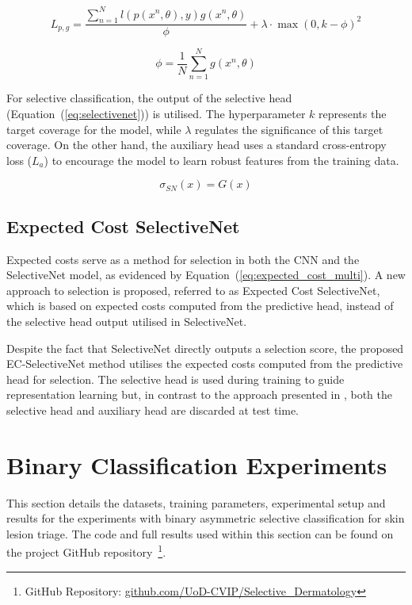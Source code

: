 \begin{equation}
	L_{p,g}=\frac{\sum^N_{n=1}l(p(x^n,\theta),y)g(x^n,\theta)}{\phi}+\lambda\cdot\max(0,k-\phi)^2
	\label{eq:selectivenet_loss}
\end{equation}

\begin{equation}
	\phi = \frac{1}{N}\sum^N_{n=1}g(x^n,\theta)
	\label{eq:coverage}
\end{equation}

\noindent For selective classification, the output of the selective head (Equation~(\ref{eq:selectivenet})) is utilised. The hyperparameter $k$ represents the target coverage for the model, while $\lambda$ regulates the significance of this target coverage. On the other hand, the auxiliary head uses a standard cross-entropy loss ($L_a$) to encourage the model to learn robust features from the training data. 

\begin{equation}
	\sigma_{SN}(x) = G(x)
	\label{eq:selectivenet}
\end{equation}

\subsection{Expected Cost SelectiveNet}
\label{subsec:ec_selectivenet}
Expected costs serve as a method for selection in both the CNN and the SelectiveNet model, as evidenced by Equation~(\ref{eq:expected_cost_multi}). A new approach to selection is proposed, referred to as Expected Cost SelectiveNet, which is based on expected costs computed from the predictive head, instead of the selective head output utilised in SelectiveNet.

Despite the fact that SelectiveNet directly outputs a selection score, the proposed EC-SelectiveNet method utilises the expected costs computed from the predictive head for selection. The selective head is used during training to guide representation learning but, in contrast to the approach presented in \cite{geifman2019selectivenet}, both the selective head and auxiliary head are discarded at test time.



\section{Binary Classification Experiments}
\label{sec:selective_binary_experiment}
This section details the datasets, training parameters, experimental setup and results for the experiments with binary asymmetric selective classification for skin lesion triage. The code and full results used within this section can be found on the project GitHub repository~\footnote{GitHub Repository: \url{github.com/UoD-CVIP/Selective_Dermatology}}.

